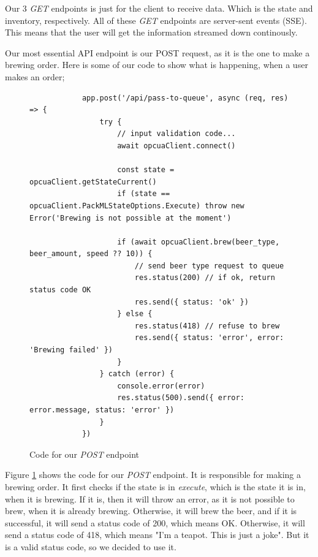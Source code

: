 Our 3 \textit{GET} endpoints is just for the client to receive data. Which is the state and inventory, respectively.
All of these \textit{GET} endpoints are server-sent events (SSE). This means that the user will get the information streamed down continously. \newline

Our most essential API endpoint is our POST request, as it is the one to make a brewing order. Here is some of our code to show what is happening, when a user makes an order;

\begin{center}
    \centering
    \begin{figure}[H]
        \begin{verbatim}
            app.post('/api/pass-to-queue', async (req, res) => {
                try {
                    // input validation code...
                    await opcuaClient.connect()
        
                    const state = opcuaClient.getStateCurrent()
                    if (state == opcuaClient.PackMLStateOptions.Execute) throw new Error('Brewing is not possible at the moment')
        
                    if (await opcuaClient.brew(beer_type, beer_amount, speed ?? 10)) {
                        // send beer type request to queue
                        res.status(200) // if ok, return status code OK
                        res.send({ status: 'ok' })
                    } else {
                        res.status(418) // refuse to brew
                        res.send({ status: 'error', error: 'Brewing failed' })
                    }
                } catch (error) {
                    console.error(error)
                    res.status(500).send({ error: error.message, status: 'error' })
                }
            })
        \end{verbatim}
        \caption{Code for our \textit{POST} endpoint}
        \label{fig:pass_to_queue_api}
    \end{figure}
\end{center}
Figure \ref{fig:pass_to_queue_api} shows the code for our \textit{POST} endpoint. 
It is responsible for making a brewing order. It first checks if the state is in \textit{execute}, 
which is the state it is in, when it is brewing. If it is, then it will throw an error, 
as it is not possible to brew, when it is already brewing. Otherwise, it will brew the beer, 
and if it is successful, it will send a status code of 200, which means OK. Otherwise, 
it will send a status code of 418, which means "I'm a teapot. This is just a joke". 
But it is a valid status code, so we decided to use it.


